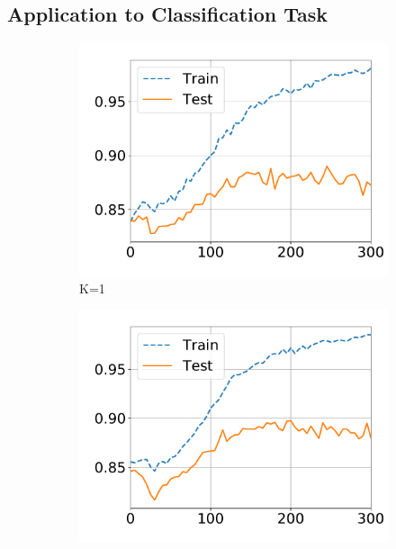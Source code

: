 \subsection{Application to Classification Task}
\begin{figure}[!ht]
  \captionsetup[subfigure]{justification=centering}
  \centering
  \begin{subfigure}{.33\textwidth}
    \centering
    \includegraphics[width=1\linewidth]{images/supply/train_curves/satimage_1.pdf}
    \vspace{-0.8cm}
    \caption{K=1}
  \end{subfigure}
  \vspace{-2pt}
  \begin{subfigure}{.33\textwidth}
    \centering
    \includegraphics[width=1\linewidth]{images/supply/train_curves/satimage_2.pdf}

\end{subfigure}
\end{figure}
